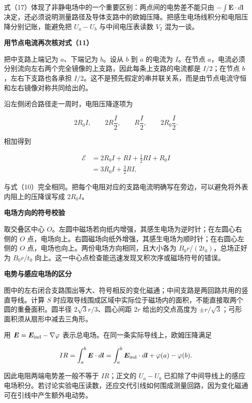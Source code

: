 \documentclass[12pt,a4paper,UTF8]{ctexart}
\begin{document}
式（17）体现了非静电场中的一个重要区别：两点间的电势差不能只由
\(-\int\bm E\cdot d\bm l\)
决定，还必须说明测量路径及导体支路中的欧姆压降。把感生电场线积分和电阻压降分别记账，能避免把
\(U_a-U_b\) 与中间电压表读数 \(V_2\) 混为一谈。

\textbf{用节点电流再次核对式（11）}

把中支路上端记为 \(a\)、下端记为 \(b\)。设从 \(b\) 到 \(a\) 的电流为
\(I\)。在节点
\(a\)，电流必须分别流向左右两个完全镜像的上支路，因此每条上支路的电流都是
\(I/2\)；在节点 \(b\)，左右下支路也各承担
\(I/2\)。这不是预先假定的串并联关系，而是由节点电流守恒和左右镜像对称共同给出的。

沿左侧闭合路径走一周时，电阻压降逐项为

\[
2R_0I,\qquad 2R\frac I2,\qquad R\frac I2,\qquad 2R_0\frac I2.
\]

相加得到

\[
\begin{aligned}
\mathcal E
&=2R_0I+R I+\frac12RI+R_0I\\
&=3R_0I+\frac32RI,
\end{aligned}
\]

与式（10）完全相同。把每个电阻对应的支路电流明确写在旁边，可以避免将外表内阻上的压降误写成
\(2R_0I\)。

\textbf{电场方向的符号校验}

取交叠区中心
\(O\)。左圆中磁场若向纸内增强，其感生电场为逆时针；在左圆心右侧的 \(O\)
点，电场向上。右圆磁场向纸外增强，其感生电场为顺时针；在右圆心左侧的
\(O\) 点，电场也向上。两份电场方向相同，且大小各为
\(B_0r/(2t_0)\)，总场正好为 \(B_0r/t_0\)
向上。这一中心点检查能迅速发现叉积次序或磁场符号的错误。

\textbf{电势与感应电场的区分}

图中的左右闭合支路围出等大、符号相反的变化磁通；中间支路是两回路共用的竖直导线。计算
\(S\)
时应取导线围成区域中实际位于磁场内的面积，不能直接取两个圆的重叠面积。圆半径
\(2\sqrt3r/3\)、圆心间距 \(2r\) 给出的交点高度为
\(\pm r/\sqrt3\)；弓形面积须从扇形中减去三角形。

用 \(\bm E=\bm E_{\rm ind}-\nabla\varphi\)
表示总电场。在同一条实际导线上，欧姆压降满足

\[IR=\int_a^b\bm E\cdot d\bm l=\int_a^b\bm E_{\rm ind}\cdot d\bm l+\varphi(a)-\varphi(b).\]

因此电阻两端电势差一般不等于 \(IR\)；正文的 \(U_a-U_b\)
已扣除了中间导线上的感应电场积分。若讨论实验电压读数，还应交代引线如何围成测量回路，因为变化磁通可在引线中产生额外电动势。

\newpage
\end{document}
